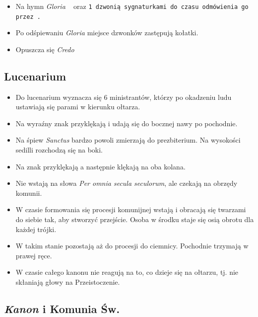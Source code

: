 \begin{itemize}
      \item Na hymn \textit{Gloria} \zz~ oraz \tt1 dzwonią sygnaturkami do czasu
            odmówienia go przez \ii.
      \item Po odśpiewaniu \textit{Gloria} miejsce dzwonków zastępują kołatki.
      \item Opuszcza się \textit{Credo}
\end{itemize}

\subsection{Lucenarium}

\begin{itemize}
      \item Do lucenarium wyznacza się 6 ministrantów, którzy po okadzeniu ludu
            ustawiają się parami w kierunku ołtarza.
      \item Na wyraźny znak  przyklękają i udają się do bocznej nawy po
            pochodnie.
      \item Na śpiew \textit{Sanctus} bardzo powoli zmierzają do prezbiterium. Na
            wysokości sedilli rozchodzą się na boki.
      \item Na znak  przyklękają a następnie klękają na oba kolana.
      \item Nie wstają na słowa \textit{Per omnia secula seculorum}, ale czekają na
            obrzędy komunii.
      \item W czasie formowania się procesji komunijnej wstają i obracają się
            twarzami do siebie tak, aby stworzyć przejście. Osoba w środku staje
            się osią obrotu dla każdej trójki.
      \item W takim stanie pozostają aż do procesji do ciemnicy. Pochodnie
            trzymają w prawej ręce.
      \item W czasie całego kanonu nie reagują na to, co dzieje się na ołtarzu,
            tj. nie skłaniają głowy na Przeistoczenie.
\end{itemize}

\subsection{\textit{Kanon} i Komunia Św.}

